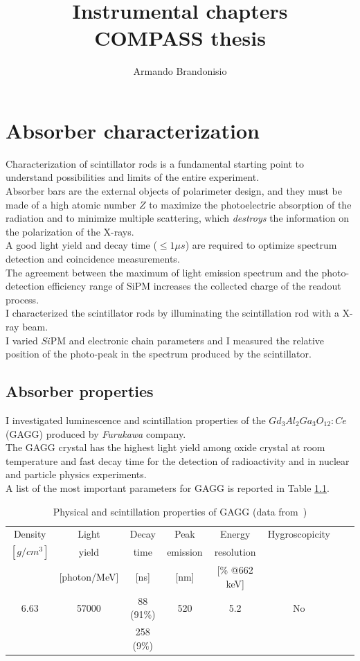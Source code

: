 \documentclass[10pt,a4paper, openany]{book}
\author{Armando Brandonisio}
\title{\textbf{Instrumental chapters}\\COMPASS thesis}
\begin{document}
\maketitle
\tableofcontents \newpage


\chapter{Absorber characterization}

Characterization of scintillator rods is a fundamental starting point to understand possibilities and limits of the entire experiment.\\
Absorber bars are the external objects of polarimeter design, and they must be made of a high atomic number $Z$ to maximize the photoelectric absorption of the radiation and to minimize multiple scattering, which \emph{destroys} the information on the polarization of the X-rays.\\
A good light yield and decay time ($\leq 1\mu s$) are required to optimize spectrum detection and coincidence measurements.\\
The agreement between the maximum of light emission spectrum and the photo-detection efficiency range of SiPM increases the collected charge of the readout process.\\
I characterized the scintillator rods by illuminating the scintillation rod with a X-ray beam.\\
I varied $Si$PM and electronic chain parameters and I measured the relative position of the photo-peak in the spectrum produced by the scintillator.


\section{Absorber properties}
I investigated luminescence and scintillation properties of the $Gd_3 Al_2 Ga_3 O_{12} : Ce$ (GAGG) produced by \emph{Furukawa} company.\\
The GAGG crystal has the highest light yield among oxide crystal at room temperature \cite{abs:1} and fast decay time for the detection of radioactivity and in nuclear and particle physics experiments.\\
A list of the most important parameters for GAGG is reported in Table \ref{tab:abs1}.

\begin{table}[h]
\begin{tabular}{cccccccc}
\toprule
Density & Light & Decay & Peak & Energy & Hygroscopicity  \\
 $[g/cm^3]$ & yield & time & emission & resolution &   \\
   & [photon/MeV] & [ns] & [nm] & [\% @662 keV] &   \\
\midrule
6.63 & 57000 & 88 (91\%) & 520 & 5.2  & No\\
 & & 258 (9\%) & & & \\
\bottomrule
\end{tabular}
\caption{Physical and scintillation properties of GAGG (data from~\cite{gagg:1})} \label{tab:abs1}
\end{table}
\end{document}
